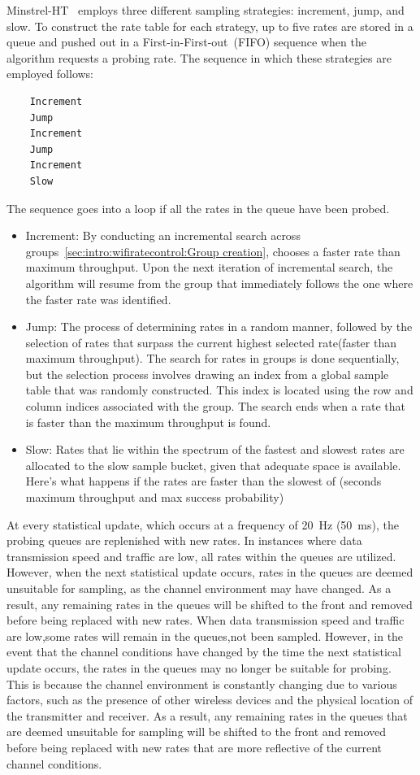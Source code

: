 Minstrel-HT~\cite{MinstrelHT(2010)} employs three different sampling strategies: increment, jump, and slow. To construct the rate table for each strategy, up to five rates are stored in a queue and pushed out in a First-in-First-out~(FIFO) sequence when the algorithm requests a probing rate. The sequence in which these strategies are employed follows:
\begin{lstlisting}
    Increment
    Jump
    Increment
    Jump
    Increment
    Slow
\end{lstlisting}
The sequence goes into a loop if all the rates in the queue have been probed.
\begin{itemize}
    \item Increment: By conducting an incremental search across groups~\ref{sec:intro:wifiratecontrol:Group creation}, chooses a faster rate than maximum throughput. Upon the next iteration of incremental search, the algorithm will resume from the group that immediately follows the one where the faster rate was identified.
    \item Jump: The process of determining rates in a random manner, followed by the selection of rates that surpass the current highest selected rate(faster than maximum throughput). The search for rates in groups is done sequentially, but the selection process involves drawing an index from a global sample table that was randomly constructed. This index is located using the row and column indices associated with the group. The search ends when a rate that is faster than the maximum throughput is found.
    \item Slow: Rates that lie within the spectrum of the fastest and slowest rates are allocated to the slow sample bucket, given that adequate space is available. Here's what happens if the rates are faster than the slowest of (seconds maximum throughput and max success probability)
\end{itemize}



At every statistical update, which occurs at a frequency of 20~Hz (50~ms), the probing queues are replenished with new rates. In instances where data transmission speed and traffic are low, all rates within the queues are utilized. However, when the next statistical update occurs, rates in the queues are deemed unsuitable for sampling, as the channel environment may have changed. As a result, any remaining rates in the queues will be shifted to the front and removed before being replaced with new rates.
When data transmission speed and traffic are low,some rates will remain in the queues,not been sampled. However, in the event that the channel conditions have changed by the time the next statistical update occurs, the rates in the queues may no longer be suitable for probing. This is because the channel environment is constantly changing due to various factors, such as the presence of other wireless devices and the physical location of the transmitter and receiver. As a result, any remaining rates in the queues that are deemed unsuitable for sampling will be shifted to the front and removed before being replaced with new rates that are more reflective of the current channel conditions.



